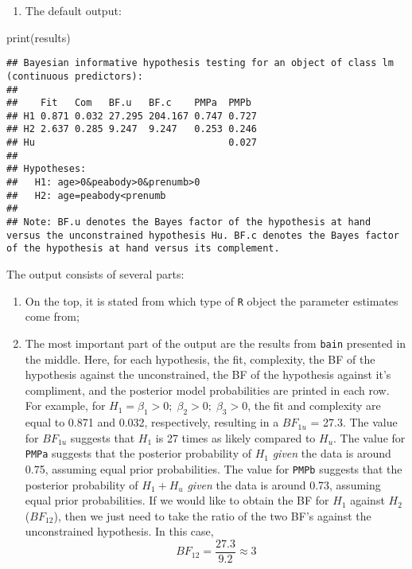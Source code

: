 \documentclass[
]{book}
\newenvironment{Shaded}{\begin{snugshade}}{\end{snugshade}}
\newcommand{\FunctionTok}[1]{\textcolor[rgb]{0.00,0.00,0.00}{#1}}
\newcommand{\NormalTok}[1]{#1}
\providecommand{\tightlist}{%
  \setlength{\itemsep}{0pt}\setlength{\parskip}{0pt}}
\begin{document}
\begin{enumerate}
\def\labelenumi{(\arabic{enumi})}
\tightlist
\item
  The default output:
\end{enumerate}

\begin{Shaded}
\begin{Highlighting}[]
\FunctionTok{print}\NormalTok{(results)}
\end{Highlighting}
\end{Shaded}

\begin{verbatim}
## Bayesian informative hypothesis testing for an object of class lm (continuous predictors):
## 
##    Fit   Com   BF.u   BF.c    PMPa  PMPb 
## H1 0.871 0.032 27.295 204.167 0.747 0.727
## H2 2.637 0.285 9.247  9.247   0.253 0.246
## Hu                                  0.027
## 
## Hypotheses:
##   H1: age>0&peabody>0&prenumb>0
##   H2: age=peabody<prenumb
## 
## Note: BF.u denotes the Bayes factor of the hypothesis at hand versus the unconstrained hypothesis Hu. BF.c denotes the Bayes factor of the hypothesis at hand versus its complement.
\end{verbatim}

The output consists of several parts:

\begin{enumerate}
\def\labelenumi{(\alph{enumi})}
\tightlist
\item
  On the top, it is stated from which type of \texttt{R} object the parameter estimates come from;
\item
  The most important part of the output are the results from \texttt{bain} presented in the middle. Here, for each hypothesis, the fit, complexity, the BF of the hypothesis against the unconstrained, the BF of the hypothesis against it's compliment, and the posterior model probabilities are printed in each row. For example, for \(H_1 =\beta_1 > 0;\; \beta_2 > 0;\; \beta_3 >0\), the fit and complexity are equal to 0.871 and 0.032, respectively, resulting in a \(BF_{1u}\) = 27.3. The value for \(BF_{1u}\) suggests that \(H_1\) is 27 times as likely compared to \(H_u\). The value for \texttt{PMPa} suggests that the posterior probability of \(H_1\) \emph{given} the data is around 0.75, assuming equal prior probabilities. The value for \texttt{PMPb} suggests that the posterior probability of \(H_1 + H_u\) \emph{given} the data is around 0.73, assuming equal prior probabilities. If we would like to obtain the BF for \(H_1\) against \(H_2\) (\(BF_{12}\)), then we just need to take the ratio of the two BF's against the unconstrained hypothesis. In this case, \[BF_{12} = \frac{27.3}{9.2} \approx 3\]
\end{enumerate}
\end{document}
